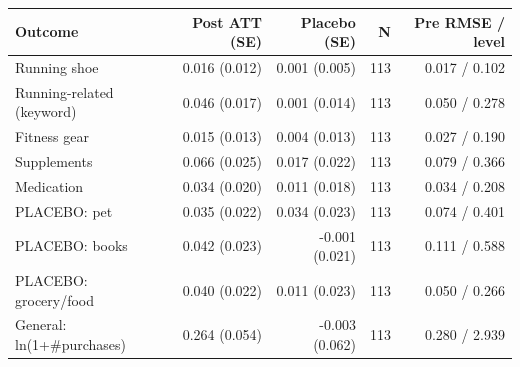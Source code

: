 \begin{tabular}{lrrrr}
\toprule
Outcome & Post ATT (SE) & Placebo (SE) & N & Pre RMSE / level \\
\midrule
Running shoe & 0.016 (0.012) & 0.001 (0.005) & 113 & 0.017 / 0.102 \\
Running-related (keyword) & 0.046 (0.017) & 0.001 (0.014) & 113 & 0.050 / 0.278 \\
Fitness gear & 0.015 (0.013) & 0.004 (0.013) & 113 & 0.027 / 0.190 \\
Supplements & 0.066 (0.025) & 0.017 (0.022) & 113 & 0.079 / 0.366 \\
Medication & 0.034 (0.020) & 0.011 (0.018) & 113 & 0.034 / 0.208 \\
PLACEBO: pet & 0.035 (0.022) & 0.034 (0.023) & 113 & 0.074 / 0.401 \\
PLACEBO: books & 0.042 (0.023) & -0.001 (0.021) & 113 & 0.111 / 0.588 \\
PLACEBO: grocery/food & 0.040 (0.022) & 0.011 (0.023) & 113 & 0.050 / 0.266 \\
General: ln(1+\#purchases) & 0.264 (0.054) & -0.003 (0.062) & 113 & 0.280 / 2.939 \\
\bottomrule
\end{tabular}
